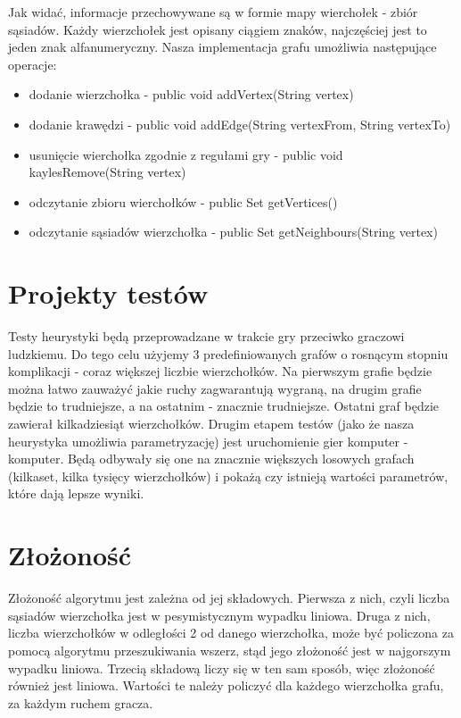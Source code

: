 \documentclass[11pt,a4paper]{article}
\begin{document}
Jak widać, informacje przechowywane są w formie mapy wierchołek - zbiór sąsiadów. Każdy wierzchołek jest opisany ciągiem znaków, najczęściej jest to jeden znak alfanumeryczny. Nasza implementacja grafu umożliwia następujące operacje:
\begin{itemize}
\item dodanie wierzchołka  - public void addVertex(String vertex)
\item dodanie krawędzi - public void addEdge(String vertexFrom, String vertexTo)
\item usunięcie wierchołka zgodnie z regułami gry - public void kaylesRemove(String vertex)
\item odczytanie zbioru wierchołków - public Set getVertices()
\item odczytanie sąsiadów wierzchołka - public Set getNeighbours(String vertex)
\end{itemize}

\section{Projekty testów}
Testy heurystyki będą przeprowadzane w trakcie gry przeciwko graczowi ludzkiemu. Do tego celu użyjemy 3 predefiniowanych grafów o rosnącym stopniu komplikacji - coraz większej liczbie wierzchołków. Na pierwszym grafie będzie można łatwo zauważyć jakie ruchy zagwarantują wygraną, na drugim grafie będzie to trudniejsze, a na ostatnim - znacznie trudniejsze. Ostatni graf będzie zawierał kilkadziesiąt wierzchołków.
Drugim etapem testów (jako że nasza heurystyka umożliwia parametryzację) jest uruchomienie gier komputer - komputer. Będą odbywały się one na znacznie większych losowych grafach (kilkaset, kilka tysięcy wierzchołków) i pokażą czy istnieją wartości parametrów, które dają lepsze wyniki.

\section{Złożoność}
Złożoność algorytmu jest zależna od jej składowych. Pierwsza z nich, czyli liczba sąsiadów wierzchołka jest w pesymistycznym wypadku liniowa. Druga z nich, liczba wierzchołków w odległości 2 od danego wierzchołka, może być policzona za pomocą algorytmu przeszukiwania wszerz, stąd jego złożoność jest w najgorszym wypadku liniowa. Trzecią składową liczy się w ten sam sposób, więc złożoność również jest liniowa. Wartości te należy policzyć dla każdego wierzchołka grafu, za każdym ruchem gracza.
\end{document}
